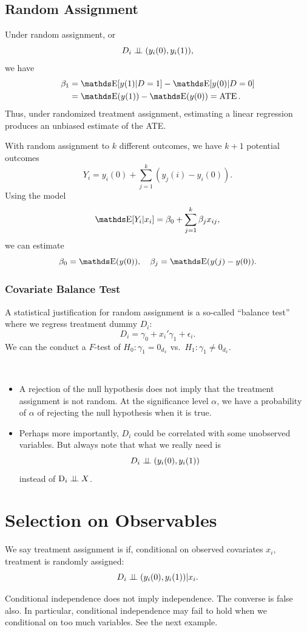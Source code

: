 \documentclass[letterpaper, 10pt]{article}
\DeclareMathOperator{\ATE}{ATE}
\begin{document}
\subsection{Random Assignment}
\begin{example}
  Under random assignment, or
  \[
    D_i \perp \!\!\! \perp (y_i(0), y_i(1)),
  \]
  we have
  \begin{align*}
    \beta_1
    &= \E[y(1)|D = 1] - \E[y(0)|D = 0] \\
    &= \E(y(1)) - \E(y(0))
    = \ATE.
  \end{align*}
  Thus, under randomized treatment assignment, estimating a linear regression produces an unbiased estimate of the ATE.

  With random assignment to \(k\) different outcomes, we have \(k + 1\) potential outcomes
  \[
    Y_i = y_i(0) + \sum_{j = 1}^k (y_j(i) - y_i(0)).
  \]
  Using the model
  \[
    \E[Y_i|x_i]
    = \beta_0 + \sum_{j = 1}^k \beta_j x_{ij},
  \]
  we can estimate
  \[
    \beta_0 = \E(y(0)), \quad
    \beta_j = \E(y(j) - y(0)).
  \]
\end{example}

\subsubsection{Covariate Balance Test}
A statistical justification for random assignment is a so-called ``balance test'' where we regress treatment dummy \(D_i\):
 \[
  D_i = \gamma_0 + x_i' \gamma_1 + \epsilon_i.
\]
We can the conduct a \(F\)-test of \(H_0: \gamma_1 = 0_{d_x}\) vs.\ \(H_1: \gamma_1 \neq 0_{d_x}\).

\begin{remark}~
  \begin{itemize}
    \item A rejection of the null hypothesis does not imply that the treatment assignment is not random.
      At the significance level \(\alpha\), we have a probability of \(\alpha\) of rejecting the null hypothesis when it is true.
    \item Perhaps more importantly, \(D_i\) could be correlated with some unobserved variables.
      But always note that what we really need is
      \[
        D_i \perp \!\!\! \perp (y_i(0), y_i(1))
      \]
      instead of \(\mathrm{D}_i \perp \!\!\! \perp X\).
  \end{itemize}
\end{remark}


\section{Selection on Observables}
\begin{definition}
  We say treatment assignment is  if, conditional on observed covariates \(x_i\), treatment is randomly assigned:
  \[
    D_i \perp \!\!\! \perp (y_i(0), y_i(1)) | x_i.
  \]
\end{definition}
\begin{remark}
  Conditional independence does not imply independence.
  The converse is false also.
  In particular, conditional independence may fail to hold when we conditional on too much variables.
  See the next example.
\end{remark}
\end{document}

